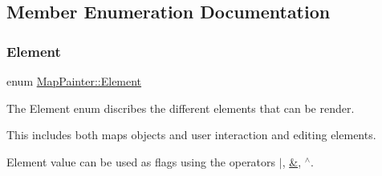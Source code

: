 \subsection{Member Enumeration Documentation}
\hypertarget{class_map_painter_a771b3fa246b6c13cc2acbdcf1cb6eee3}{}\label{class_map_painter_a771b3fa246b6c13cc2acbdcf1cb6eee3} 
\subsubsection{\texorpdfstring{Element}{Element}}
{\footnotesize\ttfamily enum \hyperlink{class_map_painter_a771b3fa246b6c13cc2acbdcf1cb6eee3}{Map\+Painter\+::\+Element}}



The Element enum discribes the different elements that can be render. 

This includes both map\textquotesingle{}s objects and user interaction and editing elements.

Element value can be used as flags using the operators \hyperlink{mappainter_8h_a8ff1425e1b187b08bee7d8d15b949f31}{$\vert$}, \hyperlink{mappainter_8h_a8ff1425e1b187b08bee7d8d15b949f31}{\&}, \hyperlink{mappainter_8h_a8ff1425e1b187b08bee7d8d15b949f31}{$^\wedge$}.

